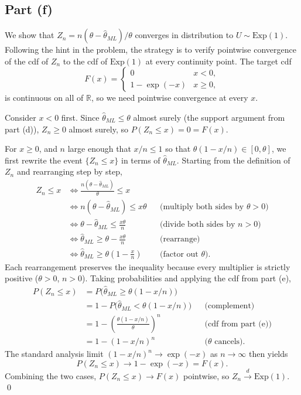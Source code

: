 \subsection*{Part (f)}

We show that $Z_n = n(\theta - \widehat\theta_{ML})/\theta$ converges in distribution to $U \sim \mathrm{Exp}(1)$. Following the hint in the problem, the strategy is to verify pointwise convergence of the cdf of $Z_n$ to the cdf of $\mathrm{Exp}(1)$ at every continuity point. The target cdf
\[
F(x) = \begin{cases} 0 & x < 0, \\ 1 - \exp(-x) & x \ge 0, \end{cases}
\]
is continuous on all of $\mathbb{R}$, so we need pointwise convergence at every $x$.

Consider $x < 0$ first. Since $\widehat\theta_{ML} \le \theta$ almost surely (the support argument from part (d)), $Z_n \ge 0$ almost surely, so $P(Z_n \le x) = 0 = F(x)$.

For $x \ge 0$, and $n$ large enough that $x/n \le 1$ so that $\theta(1 - x/n) \in [0, \theta]$, we first rewrite the event $\{Z_n \le x\}$ in terms of $\widehat\theta_{ML}$. Starting from the definition of $Z_n$ and rearranging step by step,
\begin{align*}
Z_n \le x
&\iff \frac{n(\theta - \widehat\theta_{ML})}{\theta} \le x \\
&\iff n(\theta - \widehat\theta_{ML}) \le x \theta && \text{(multiply both sides by $\theta > 0$)} \\
&\iff \theta - \widehat\theta_{ML} \le \frac{x \theta}{n} && \text{(divide both sides by $n > 0$)} \\
&\iff \widehat\theta_{ML} \ge \theta - \frac{x \theta}{n} && \text{(rearrange)} \\
&\iff \widehat\theta_{ML} \ge \theta\left(1 - \frac{x}{n}\right) && \text{(factor out $\theta$)}.
\end{align*}
Each rearrangement preserves the inequality because every multiplier is strictly positive ($\theta > 0$, $n > 0$). Taking probabilities and applying the cdf from part (e),
\begin{align*}
P(Z_n \le x)
&= P\bigl(\widehat\theta_{ML} \ge \theta(1 - x/n)\bigr) \\
&= 1 - P\bigl(\widehat\theta_{ML} < \theta(1 - x/n)\bigr) && \text{(complement)} \\
&= 1 - \left(\frac{\theta(1 - x/n)}{\theta}\right)^n && \text{(cdf from part (e))} \\
&= 1 - (1 - x/n)^n && \text{($\theta$ cancels)}.
\end{align*}
The standard analysis limit $(1 - x/n)^n \to \exp(-x)$ as $n \to \infty$ then yields
\[
P(Z_n \le x) \to 1 - \exp(-x) = F(x).
\]
Combining the two cases, $P(Z_n \le x) \to F(x)$ pointwise, so $Z_n \overset{d}{\longrightarrow} \mathrm{Exp}(1)$. \qed

